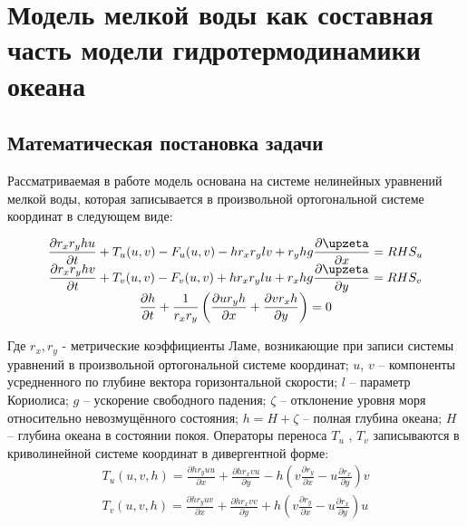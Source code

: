 \chapter{Модель мелкой воды как составная часть модели гидротермодинамики океана}\label{ch:ch1}

\section{Математическая постановка задачи}\label{sec:ch1/sec1}

Рассматриваемая в работе модель основана на системе нелинейных уравнений мелкой воды, которая записывается в произвольной ортогональной системе координат
в следующем виде:

\begin{equation} \label{eq:ch1/sec1/1}
    \begin{array}{c}
        \displaystyle{ \d{r_x r_y h u}{t} + T_u(u, v) - F_u(u, v) - h r_x r_y l v + r_y h g \d{\zeta}{x} = RHS_u } \\

        \displaystyle{ \d{r_x r_y h v}{t} + T_v(u, v) - F_v(u, v) + h r_x r_y l u + r_x h g \d{\zeta}{y} = RHS_v } \\

        \displaystyle{ \d{h}{t} + \frac{1}{r_x r_y} \left( \d{u r_y h}{x} + \d{v r_x h}{y} \right) = 0 }
    \end{array}
\end{equation}

Где $r_x, r_y$ - метрические коэффициенты Ламе, возникающие при записи системы уравнений в произвольной ортогональной системе координат;
$u$, $v$ – компоненты усредненного по глубине вектора горизонтальной скорости; $l$ – параметр Кориолиса;
$g$ – ускорение свободного падения; $\zeta$ – отклонение уровня моря относительно невозмущённого состояния;
$h = H + \zeta$ – полная глубина океана; $H$ – глубина океана в состоянии покоя.
Операторы переноса $T_u$ , $T_v$ записываются в криволинейной системе координат в дивергентной форме:
\begin{equation} \label{eq:ch1/sec1/2}
    \begin{array}{c}
        \displaystyle{T_{u} (u,v,h)=\frac{\partial hr_{y} uu}{\partial x} +\frac{\partial hr_{x} vu}{\partial y} - h\left(v\frac{\partial r_{y} }{\partial x} -u\frac{\partial r_{x} }{\partial y} \right)v} \\

        \displaystyle{T_{v} (u,v,h)=\frac{\partial hr_{y} uv}{\partial x} +\frac{\partial hr_{x} vv}{\partial y} + h\left(v\frac{\partial r_{y} }{\partial x} -u\frac{\partial r_{x} }{\partial y} \right)u}
    \end{array}
\end{equation}

